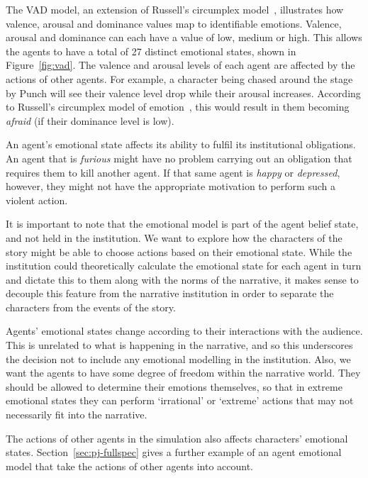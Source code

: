 \documentclass[11pt]{report}
\def\jnote#1{\todo[color=CornflowerBlue,size=\scriptsize]{Julian: #1}}
\begin{document}
The VAD model, an extension of Russell's circumplex
model~\citep{russell1980circumplex}, illustrates how valence, arousal and
dominance values map to identifiable emotions. Valence, arousal and dominance
can each have a value of low, medium or high. This allows the agents to have a
total of 27 distinct emotional states, shown in Figure~\ref{fig:vad}.
The valence and arousal levels of each agent are affected by the actions of other agents. For example, a character being chased around the stage by Punch will see their valence level drop while their arousal increases. According to Russell's circumplex model of emotion~\citep{russell1980circumplex}, this would result in them becoming \emph{afraid\/} (if their dominance level is low).

An agent's emotional state affects its ability to fulfil its institutional obligations. An agent that is \emph{furious\/} might have no problem carrying out an obligation that requires them to kill another agent. If that same agent is \emph{happy\/} or \emph{depressed}, however, they might not have the appropriate motivation to perform such a violent action.

It is important to note that the emotional model is part of the agent belief state, and not held in the institution. We want to explore how the characters of the story might be able to choose actions based on their emotional state. While the institution could theoretically calculate the emotional state for each agent in turn and dictate this to them along with the norms of the narrative, it makes sense to decouple this feature from the narrative institution in order to separate the characters from the events of the story. %

Agents' emotional states change according to their interactions with the audience. This is unrelated to what is happening in the narrative, and so this underscores the decision not to include any emotional modelling in the institution. Also, we want the agents to have some degree of freedom within the narrative world. They should be allowed to determine their emotions themselves, so that in extreme emotional states they can perform `irrational' or `extreme' actions that may not necessarily fit into the narrative.

The actions of other agents in the simulation also affects characters' emotional
states. Section~\ref{sec:pj-fullspec} gives a further example of an agent emotional
model that take the actions of other agents into account.
\end{document}
